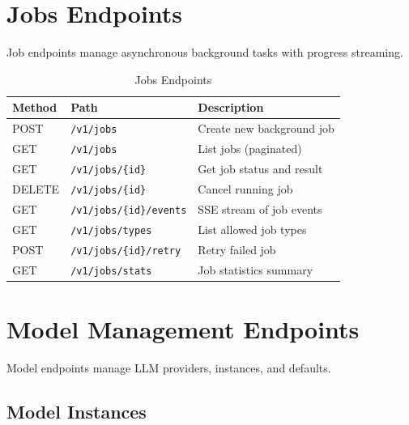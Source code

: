 \documentclass[a4paper,twoside]{sapthesis}
\begin{document}
\section{Jobs Endpoints}
\label{app:api:jobs}

Job endpoints manage asynchronous background tasks with progress streaming.

\begin{table}[ht]
\centering
\caption{Jobs Endpoints}
\label{tab:jobs-endpoints}
\small
\begin{tabularx}{\textwidth}{llX}
    \hline
    \textbf{Method} & \textbf{Path} & \textbf{Description} \\
    \hline
    POST & \texttt{/v1/jobs} & Create new background job \\
    GET & \texttt{/v1/jobs} & List jobs (paginated) \\
    GET & \texttt{/v1/jobs/\{id\}} & Get job status and result \\
    DELETE & \texttt{/v1/jobs/\{id\}} & Cancel running job \\
    GET & \texttt{/v1/jobs/\{id\}/events} & SSE stream of job events \\
    GET & \texttt{/v1/jobs/types} & List allowed job types \\
    POST & \texttt{/v1/jobs/\{id\}/retry} & Retry failed job \\
    GET & \texttt{/v1/jobs/stats} & Job statistics summary \\
    \hline
\end{tabularx}
\end{table}

\section{Model Management Endpoints}
\label{app:api:models}

Model endpoints manage LLM providers, instances, and defaults.

\subsection{Model Instances}
\end{document}
